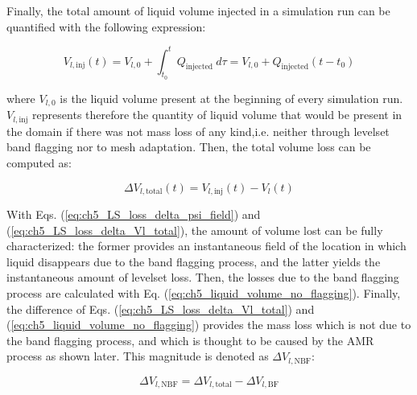 Finally, the total amount of liquid volume injected in a simulation run can be quantified with the following expression:


\begin{equation}
\label{eq:ch5_liquid_volume_injected}
V_{l,\mathrm{inj}} \left( t \right) = V_{l,0} + \int_{t_0}^t Q_\mathrm{injected}~d\tau = V_{l,0} + Q_\mathrm{injected}  \left( t - t_0 \right)
\end{equation}

where $V_{l,0}$ is the liquid volume present at the beginning of every simulation run. $V_{l,\mathrm{inj}}$ represents therefore the quantity of liquid volume that would be present in the domain if there was not mass loss of any kind,i.e. neither through levelset band flagging nor to mesh adaptation. Then, the total volume loss can be computed as:

\begin{equation}
\label{eq:ch5_LS_loss_delta_Vl_total}
\Delta V_{l,\mathrm{total}}  \left( t \right)  = V_{l,\mathrm{inj}} \left( t \right) - V_l \left( t \right)
\end{equation}

With Eqs. (\ref{eq:ch5_LS_loss_delta_psi_field}) and (\ref{eq:ch5_LS_loss_delta_Vl_total}), the amount of volume lost can be fully characterized: the former provides an instantaneous field of the location in which liquid disappears due to the band flagging process, and the latter yields the instantaneous amount of levelset loss. Then, the losses due to the band flagging process are calculated with Eq. (\ref{eq:ch5_liquid_volume_no_flagging}). Finally, the difference of Eqs. (\ref{eq:ch5_LS_loss_delta_Vl_total}) and (\ref{eq:ch5_liquid_volume_no_flagging}) provides the mass loss which is not due to the band flagging process, and which is thought to be caused by the AMR process as shown later. This magnitude is denoted as $\Delta V_{l,\mathrm{NBF}}$: 

\begin{equation}
\Delta V_{l,\mathrm{NBF}} = \Delta V_{l,\mathrm{total}} - \Delta V_{l,\mathrm{BF}}
\end{equation}

